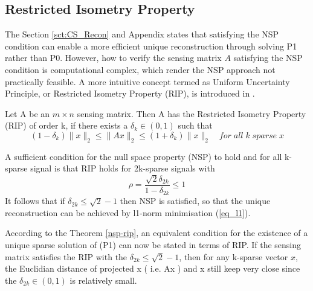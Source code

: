 \subsection{Restricted Isometry Property}\label{subsct:RIP}

The Section \ref{sct:CS_Recon} and Appendix states that satisfying the NSP condition can enable a more efficient unique reconstruction through solving P1 rather than P0. However, how to verify the sensing matrix $A$ satisfying the NSP condition is computational complex, which render the NSP approach  not practically feasible. A more intuitive concept termed as Uniform Uncertainty Principle, or Restricted Isometry Property (RIP), is introduced in \cite{candes2006robust}. 



\begin{mydef}
\label{rip-def}
Let A be an $m \times n$ sensing matrix. Then A has the Restricted Isometry Property (RIP) of order k, if there exists a $\delta_k \in (0, 1)$ such that
\begin{equation}
(1-\delta_k)\|x\|_2 \leq \|Ax\|_2 \leq (1+\delta_k)\|x\|_2 \quad for \; all \; k\; sparse \; x
\end{equation}
\end{mydef}
\begin{theorem}\cite{candes2006robust}
\label{nsp-rip}
A sufficient condition for the null space property (NSP) to hold and for all k-sparse signal is that RIP holds for 2k-sparse signals with
\begin{equation}
\rho = \frac{\sqrt{2} \delta_{2k}}{1-\delta_{2k}} \leq 1
\end{equation}
It follows that if $\delta_{2k} \leq \sqrt{2}-1$ then NSP is satisfied, so that the unique reconstruction can be achieved by l1-norm minimisation (\ref{eq_l1}).
\end{theorem}
According to the Theorem \ref{nsp-rip}, an equivalent condition for the existence of a unique sparse solution of (P1) can now be stated in terms of RIP. If the sensing matrix satisfies the RIP with the $\delta_{2k} \leq \sqrt{2}-1$, then for any k-sparse vector $x$, the Euclidian distance of projected x ( i.e. Ax ) and x still keep very close since the $\delta_{2k} \in (0,1)$ is relatively small.






